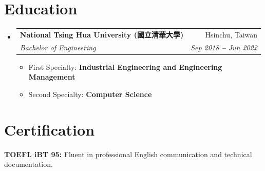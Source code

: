 \documentclass[letterpaper,11pt]{article}
\makeatletter
\newcommand{\resumeItem}[1]{
  \item\small{
    {#1 \vspace{-2pt}}
  }
}
\newcommand{\resumeSubheading}[4]{
  \vspace{-2pt}\item
    \begin{tabular*}{0.97\textwidth}[t]{l@{\extracolsep{\fill}}r}
      \textbf{#1} & #2 \\
      \textit{\small#3} & \textit{\small #4} \\
    \end{tabular*}\vspace{-7pt}
}
\newcommand{\resumeSubHeadingListStart}{\begin{itemize}[leftmargin=0.15in, label={}]}
\newcommand{\resumeSubHeadingListEnd}{\end{itemize}}
\newcommand{\resumeItemListStart}{\begin{itemize}[label=\raisebox{0.2ex}{\tiny$\bullet$}, itemsep=1pt, parsep=0pt]}
\newcommand{\resumeItemListEnd}{\end{itemize}\vspace{-5pt}}
\makeatother
\begin{document}
\section{Education}
  \resumeSubHeadingListStart
    \resumeSubheading
      {National Tsing Hua University (國立清華大學)}{Hsinchu, Taiwan}
      {Bachelor of Engineering}{Sep 2018 \textbf{--} Jun 2022}
      \resumeItemListStart
        \resumeItem{First Specialty: \textbf{Industrial Engineering and Engineering Management}}
        \resumeItem{Second Specialty: \textbf{Computer Science}}
      \resumeItemListEnd
  \resumeSubHeadingListEnd

\section{Certification}
  \resumeSubHeadingListStart
    \small{\item{
        \textbf{TOEFL iBT 95:}{ Fluent in professional English communication and technical documentation.}
    }}
  \resumeSubHeadingListEnd

\end{document}
